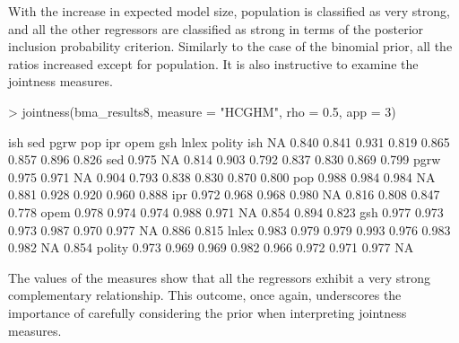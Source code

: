 \documentclass[a4paper]{article}
\begin{document}
With the increase in expected model size, population is classified as very strong, and all the other regressors are classified as strong in terms of the posterior inclusion probability criterion.
Similarly to the case of the binomial prior, all the ratios increased except for population.
It is also instructive to examine the jointness measures.
\begin{Schunk}
\begin{Sinput}
> jointness(bma_results8, measure = "HCGHM", rho = 0.5, app = 3)
\end{Sinput}
\begin{Soutput}
         ish   sed  pgrw   pop   ipr  opem   gsh lnlex polity
ish       NA 0.840 0.841 0.931 0.819 0.865 0.857 0.896  0.826
sed    0.975    NA 0.814 0.903 0.792 0.837 0.830 0.869  0.799
pgrw   0.975 0.971    NA 0.904 0.793 0.838 0.830 0.870  0.800
pop    0.988 0.984 0.984    NA 0.881 0.928 0.920 0.960  0.888
ipr    0.972 0.968 0.968 0.980    NA 0.816 0.808 0.847  0.778
opem   0.978 0.974 0.974 0.988 0.971    NA 0.854 0.894  0.823
gsh    0.977 0.973 0.973 0.987 0.970 0.977    NA 0.886  0.815
lnlex  0.983 0.979 0.979 0.993 0.976 0.983 0.982    NA  0.854
polity 0.973 0.969 0.969 0.982 0.966 0.972 0.971 0.977     NA
\end{Soutput}
\end{Schunk}
The values of the measures show that all the regressors exhibit a very strong complementary relationship.
This outcome, once again, underscores the importance of carefully considering the prior when interpreting jointness measures.
\end{document}
